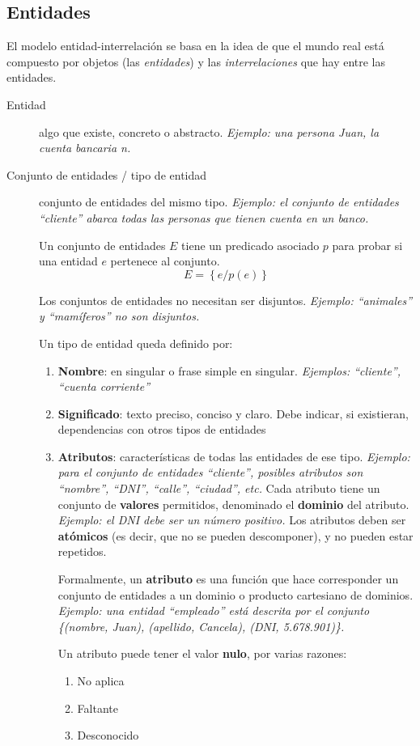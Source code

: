 \documentclass[a4paper, twoside]{article}
\begin{document}
\subsection{Entidades}
El modelo entidad-interrelación se basa en la idea de que el mundo real está compuesto por objetos (las \emph{entidades}) y las \emph{interrelaciones} que hay entre las entidades.

\begin{description}
	\item[Entidad] algo que existe, concreto o abstracto. \emph{Ejemplo: una persona Juan, la cuenta bancaria n.}
	\item[Conjunto de entidades / tipo de entidad] conjunto de entidades del mismo tipo. \emph{Ejemplo: el conjunto de entidades ``cliente'' abarca todas las personas que tienen cuenta en un banco.}

	Un conjunto de entidades $E$ tiene un predicado asociado $p$ para probar si una entidad $e$ pertenece al conjunto.
	\[
		E = \left\{ e/p(e)\right\} 
	\]

	Los conjuntos de entidades no necesitan ser disjuntos. \emph{Ejemplo: ``animales'' y ``mamíferos'' no son disjuntos.}

	Un tipo de entidad queda definido por:
	\begin{enumerate}
		\item \textbf{Nombre}: en singular o frase simple en singular. \emph{Ejemplos: ``cliente'', ``cuenta corriente''}
		\item \textbf{Significado}: texto preciso, conciso y claro. Debe indicar, si existieran, dependencias con otros tipos de entidades
		\item \textbf{Atributos}: características de todas las entidades de ese tipo. \emph{Ejemplo: para el conjunto de entidades ``cliente'', posibles atributos son ``nombre'', ``DNI'', ``calle'', ``ciudad'', etc.} Cada atributo tiene un conjunto de \textbf{valores} permitidos, denominado el \textbf{dominio }del atributo. \emph{Ejemplo: el DNI debe ser un número positivo.} Los atributos deben ser \textbf{atómicos} (es decir, que no se pueden descomponer), y no pueden estar repetidos.

		Formalmente, un \textbf{atributo} es una función que hace corresponder un conjunto de entidades a un dominio o producto cartesiano de dominios. \emph{Ejemplo: una entidad ``empleado'' está descrita por el conjunto \{(nombre, Juan), (apellido, Cancela), (DNI, 5.678.901)\}.}

		Un atributo puede tener el valor \textbf{nulo}, por varias razones:
		\begin{enumerate}
			\item No aplica
			\item Faltante
			\item Desconocido
		\end{enumerate}


\end{enumerate}
\end{description}
\end{document}
